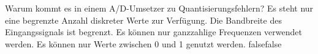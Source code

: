     {Warum kommt es in einem A/D-Umsetzer zu Quantisierungsfehlern?}
    {Es steht nur eine begrenzte Anzahl diskreter Werte zur Verfügung.}
    {Die Bandbreite des Eingangssignals ist begrenzt.}
    {Es können nur ganzzahlige Frequenzen verwendet werden.}
    {Es können nur Werte zwischen 0 und 1 genutzt werden.}
    {false}{false}